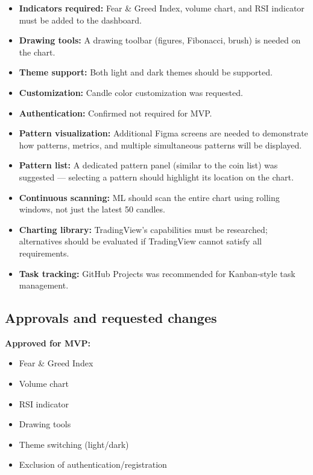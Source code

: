 \documentclass[11pt,a4paper]{article}
\begin{document}
\begin{itemize}
    \item \textbf{Indicators required:} Fear \& Greed Index, volume chart, and RSI indicator must be added to the dashboard.
    \item \textbf{Drawing tools:} A drawing toolbar (figures, Fibonacci, brush) is needed on the chart.
    \item \textbf{Theme support:} Both light and dark themes should be supported.
    \item \textbf{Customization:} Candle color customization was requested.
    \item \textbf{Authentication:} Confirmed not required for MVP.
    \item \textbf{Pattern visualization:} Additional Figma screens are needed to demonstrate how patterns, metrics, and multiple simultaneous patterns will be displayed.
    \item \textbf{Pattern list:} A dedicated pattern panel (similar to the coin list) was suggested — selecting a pattern should highlight its location on the chart.
    \item \textbf{Continuous scanning:} ML should scan the entire chart using rolling windows, not just the latest 50 candles.
    \item \textbf{Charting library:} TradingView's capabilities must be researched; alternatives should be evaluated if TradingView cannot satisfy all requirements.
    \item \textbf{Task tracking:} GitHub Projects was recommended for Kanban-style task management.
\end{itemize}

\subsection{Approvals and requested changes}

\textbf{Approved for MVP:}
\begin{itemize}
    \item Fear \& Greed Index
    \item Volume chart
    \item RSI indicator
    \item Drawing tools
    \item Theme switching (light/dark)
    \item Exclusion of authentication/registration
\end{itemize}
\end{document}
